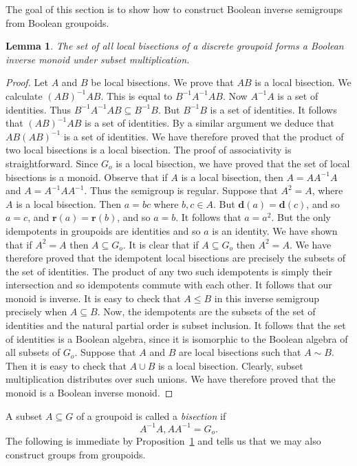 \documentclass[a4paper]{amsart}
\newtheorem{lemma}[theorem]{Lemma}
\begin{document}
The goal of this section is to show how to construct Boolean inverse semigroups from Boolean groupoids.

\begin{lemma}\label{lem:tea} 
The set of all local bisections of a discrete groupoid forms a Boolean inverse monoid under subset multiplication.
\end{lemma}
\begin{proof} Let $A$ and $B$ be local bisections.
We prove that $AB$ is a local bisection.
We calculate $(AB)^{-1}AB$.
This is equal to $B^{-1}A^{-1}AB$.
Now $A^{-1}A$ is a set of identities.
Thus $B^{-1}A^{-1}AB \subseteq B^{-1}B$.
But $B^{-1}B$ is a set of identities.
It follows that $(AB)^{-1}AB$ is a set of identities.
By a similar argument we deduce that $AB(AB)^{-1}$ is a set of identities.
We have therefore proved that the product of two local bisections is a local bisection.
The proof of associativity is straightforward.
Since $G_{o}$ is a local bisection, we have proved that the set of local bisections is a monoid.
Observe that if $A$ is a local bisection, then  $A = AA^{-1}A$ and $A = A^{-1}AA^{-1}$.
Thus the semigroup is regular.
Suppose that $A^{2} = A$, where $A$ is a local bisection.
Then $a = bc$ where $b,c \in A$.
But $\mathbf{d}(a) = \mathbf{d}(c)$, and so $a = c$,
and $\mathbf{r}(a) = \mathbf{r}(b)$, and so $a = b$.
It follows that $a = a^{2}$.
But the only idempotents in groupoids are identities and so $a$ is an identity.
We have shown that if $A^{2} = A$ then $A \subseteq G_{o}$.
It is clear that if $A \subseteq G_{o}$ then $A^{2} = A$.
We have therefore proved that the idempotent local bisections are precisely the subsets of
the set of identities.
The product of any two such idempotents is simply their intersection
and so idempotents commute with each other.
It follows that our monoid is inverse.
It is easy to check that $A \leq B$ in this inverse semigroup precisely when
$A \subseteq B$.
Now, the idempotents are the subsets of the set of identities
and the natural partial order is subset inclusion.
It follows that the set of identities is a Boolean algebra,
since it is isomorphic to the Boolean algebra of all subsets of $G_{o}$.
Suppose that $A$ and $B$ are local bisections such that $A \sim B$.
Then it is easy to check that $A \cup B$ is a local bisection.
Clearly, subset multiplication distributes over such unions.
We have therefore proved that the monoid is a Boolean inverse monoid.
\end{proof}

A subset $A \subseteq G$ of a groupoid is called a {\em bisection} if
$$A^{-1}A, AA^{-1} = G_{o}.$$
The following is immediate by Proposition~\ref{lem:tea} and tells us that we may also construct groups from groupoids.
\end{document}
